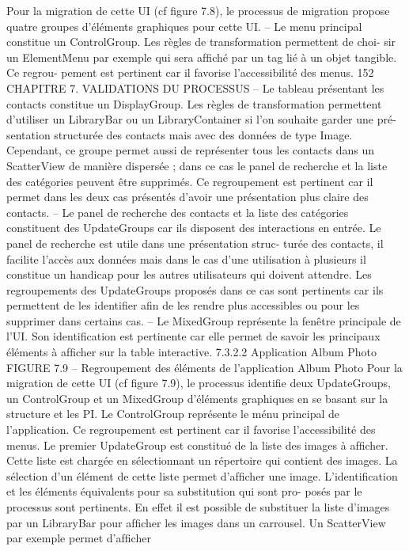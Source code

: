 \documentclass{article}
\begin{document}
Pour la migration de cette UI (cf ﬁgure 7.8), le processus de migration propose quatre groupes
d’éléments graphiques pour cette UI.
– Le menu principal constitue un ControlGroup. Les règles de transformation permettent de choi-
sir un ElementMenu par exemple qui sera afﬁché par un tag lié à un objet tangible. Ce regrou-
pement est pertinent car il favorise l’accessibilité des menus.
152
CHAPITRE 7. VALIDATIONS DU PROCESSUS
– Le tableau présentant les contacts constitue un DisplayGroup. Les règles de transformation
permettent d’utiliser un LibraryBar ou un LibraryContainer si l’on souhaite garder une pré-
sentation structurée des contacts mais avec des données de type Image. Cependant, ce groupe
permet aussi de représenter tous les contacts dans un ScatterView de manière dispersée ; dans
ce cas le panel de recherche et la liste des catégories peuvent être supprimés. Ce regroupement
est pertinent car il permet dans les deux cas présentés d’avoir une présentation plus claire des
contacts.
– Le panel de recherche des contacts et la liste des catégories constituent des UpdateGroups car ils
disposent des interactions en entrée. Le panel de recherche est utile dans une présentation struc-
turée des contacts, il facilite l’accès aux données mais dans le cas d’une utilisation à plusieurs
il constitue un handicap pour les autres utilisateurs qui doivent attendre. Les regroupements des
UpdateGroups proposés dans ce cas sont pertinents car ils permettent de les identiﬁer aﬁn de
les rendre plus accessibles ou pour les supprimer dans certains cas.
– Le MixedGroup représente la fenêtre principale de l’UI. Son identiﬁcation est pertinente car
elle permet de savoir les principaux éléments à afﬁcher sur la table interactive.
7.3.2.2
Application Album Photo
FIGURE 7.9 – Regroupement des éléments de l’application Album Photo
Pour la migration de cette UI (cf ﬁgure 7.9), le processus identiﬁe deux UpdateGroups, un
ControlGroup et un MixedGroup d’éléments graphiques en se basant sur la structure et les PI.
Le ControlGroup représente le ménu principal de l’application. Ce regroupement est pertinent car
il favorise l’accessibilité des menus.
Le premier UpdateGroup est constitué de la liste des images à afﬁcher. Cette liste est chargée en
sélectionnant un répertoire qui contient des images. La sélection d’un élément de cette liste permet
d’afﬁcher une image. L’identiﬁcation et les éléments équivalents pour sa substitution qui sont pro-
posés par le processus sont pertinents. En effet il est possible de substituer la liste d’images par un
LibraryBar pour afﬁcher les images dans un carrousel. Un ScatterView par exemple permet d’afﬁcher
\end{document}

